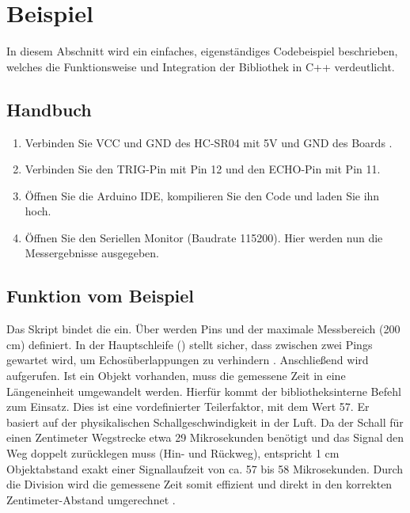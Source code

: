 \section{Beispiel}
In diesem Abschnitt wird ein einfaches, eigenständiges Codebeispiel beschrieben, welches die Funktionsweise und Integration der Bibliothek in C++ verdeutlicht.

\subsection{Handbuch}

\begin{enumerate}
	\item Verbinden Sie VCC und GND des HC-SR04 mit 5V und GND des Boards \cite{KT:2012}. 
	\item Verbinden Sie den TRIG-Pin mit Pin 12 und den ECHO-Pin mit Pin 11.
	\item Öffnen Sie die Arduino IDE, kompilieren Sie den Code und laden Sie ihn hoch.
	\item Öffnen Sie den Seriellen Monitor (Baudrate 115200). Hier werden nun die Messergebnisse ausgegeben\cite{SparkFun:2020}.
\end{enumerate} 

\subsection{Funktion vom Beispiel}                                                                                                                                                                                                                                                                                                                                                                                                                                      
Das Skript bindet die  ein. Über  werden Pins und der maximale Messbereich (200 cm) definiert. In der Hauptschleife () stellt  sicher, dass zwischen zwei Pings gewartet wird, um Echosüberlappungen zu verhindern \cite{Eckel:2023}. Anschlie\ss end wird  aufgerufen. Ist ein Objekt vorhanden, muss die gemessene Zeit in eine Längeneinheit umgewandelt werden. Hierfür kommt der bibliotheksinterne Befehl  zum Einsatz. Dies ist eine vordefinierter Teilerfaktor, mit dem Wert 57. Er basiert auf der physikalischen Schallgeschwindigkeit in der Luft. Da der Schall für einen Zentimeter Wegstrecke etwa 29 Mikrosekunden benötigt und das Signal den Weg doppelt zurücklegen muss (Hin- und Rückweg), entspricht 1 cm Objektabstand exakt einer Signallaufzeit von ca. 57 bis 58 Mikrosekunden. Durch die Division  wird die gemessene Zeit somit effizient und direkt in den korrekten Zentimeter-Abstand umgerechnet \cite{Eckel:2023}.

